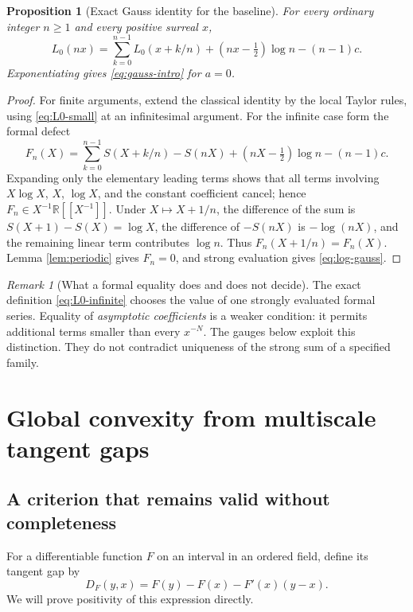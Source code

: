 \documentclass[11pt,letterpaper]{article}
\numberwithin{equation}{section}
\theoremstyle{plain}
\newtheorem{proposition}[proposition]{Proposition}
\theoremstyle{definition}
\theoremstyle{remark}
\newtheorem{remark}[remark]{Remark}
\newcommand{\R}{\mathbb R}
\begin{document}
\begin{proposition}[Exact Gauss identity for the baseline]\label{prop:gauss0}
For every ordinary integer $n\ge1$ and every positive surreal $x$,
\begin{equation}\label{eq:log-gauss}
 L_0(nx)=\sum_{k=0}^{n-1}L_0(x+k/n)
 +(nx-\tfrac12)\log n-(n-1)c.
\end{equation}
Exponentiating gives \eqref{eq:gauss-intro} for $a=0$.
\end{proposition}
\begin{proof}
For finite arguments, extend the classical identity
\cite[Eq.~5.5.6]{DLMF55} by the local Taylor rules, using
\eqref{eq:L0-small} at an infinitesimal argument. For the infinite case form
the formal defect
\[
 F_n(X)=\sum_{k=0}^{n-1}S(X+k/n)-S(nX)
 +(nX-\tfrac12)\log n-(n-1)c.
\]
Expanding only the elementary leading terms shows that all terms involving
$X\log X$, $X$, $\log X$, and the constant coefficient cancel; hence
$F_n\in X^{-1}\R[[X^{-1}]]$. Under $X\mapsto X+1/n$, the difference of
the sum is $S(X+1)-S(X)=\log X$, the difference of $-S(nX)$ is
$-\log(nX)$, and the remaining linear term contributes $\log n$.
Thus $F_n(X+1/n)=F_n(X)$. Lemma \ref{lem:periodic} gives $F_n=0$,
and strong evaluation gives \eqref{eq:log-gauss}.
\end{proof}

\begin{remark}[What a formal equality does and does not decide]
The exact definition \eqref{eq:L0-infinite} chooses the value of one
strongly evaluated formal series. Equality of \emph{asymptotic coefficients}
is a weaker condition: it permits additional terms smaller than every
$x^{-N}$. The gauges below exploit this distinction. They do not contradict
uniqueness of the strong sum of a specified family.
\end{remark}

\section{Global convexity from multiscale tangent gaps}\label{sec:convexity}

\subsection{A criterion that remains valid without completeness}
For a differentiable function $F$ on an interval in an ordered field, define
its tangent gap by
\begin{equation}\label{eq:tangent-gap}
 D_F(y,x)=F(y)-F(x)-F'(x)(y-x).
\end{equation}
We will prove positivity of this expression directly.
\end{document}
